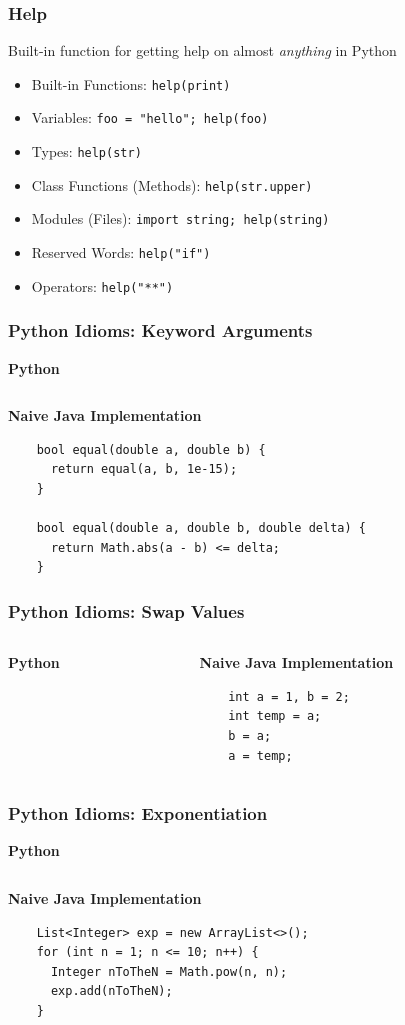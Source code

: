 \documentclass{beamer}
\begin{document}
\begin{frame}
  \frametitle{Help}
  Built-in function for getting help on almost \textit{anything} in Python
  \begin{itemize}
    \item Built-in Functions: \lstinline{help(print)}
    \item Variables: \lstinline{foo = "hello"; help(foo)}
    \item Types: \lstinline{help(str)}
    \item Class Functions (Methods): \lstinline{help(str.upper)}
    \item Modules (Files): \lstinline{import string; help(string)}
    \item Reserved Words: \lstinline{help("if")}
    \item Operators: \lstinline{help("**")}
  \end{itemize}
\end{frame}


\begin{frame}[fragile]
  \frametitle{Python Idioms: Keyword Arguments}
  \textbf{Python}
  \inputminted{python}{keyword.py}
  
  \textbf{Naive Java Implementation}
  \begin{lstlisting}
    bool equal(double a, double b) {
      return equal(a, b, 1e-15); 
    }

    bool equal(double a, double b, double delta) {
      return Math.abs(a - b) <= delta;
    }
   \end{lstlisting}
\end{frame}
  

\begin{frame}[fragile]
  \frametitle{Python Idioms: Swap Values}
  \begin{columns}
  \begin{column}{0.5\textwidth}
    \textbf{Python}
    \inputminted{python}{swap.py}
  \end{column}
  \begin{column}{0.5\textwidth}
  \textbf{Naive Java Implementation}
  \begin{lstlisting}
    int a = 1, b = 2;
    int temp = a;
    b = a;
    a = temp;
  \end{lstlisting}
  \end{column}
  \end{columns}
\end{frame}

\begin{frame}[fragile]
  \frametitle{Python Idioms: Exponentiation}
  \textbf{Python}
  \inputminted{python}{exponentiation.py}
  
  \textbf{Naive Java Implementation}
  \begin{lstlisting}
    List<Integer> exp = new ArrayList<>();
    for (int n = 1; n <= 10; n++) {
      Integer nToTheN = Math.pow(n, n);
      exp.add(nToTheN);
    }
  \end{lstlisting}
\end{frame}
\end{document}
